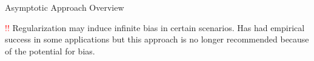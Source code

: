 \documentclass[aspectratio=169, professionalfonts, handout]{beamer}
\begin{document}
\begin{frame}{Asymptotic Approach Overview}

	\textcolor{red}{!!}	Regularization may induce infinite bias in certain scenarios. Has had empirical success in some applications but this approach is no longer recommended because of the potential for bias.
\end{frame}
\end{document}
